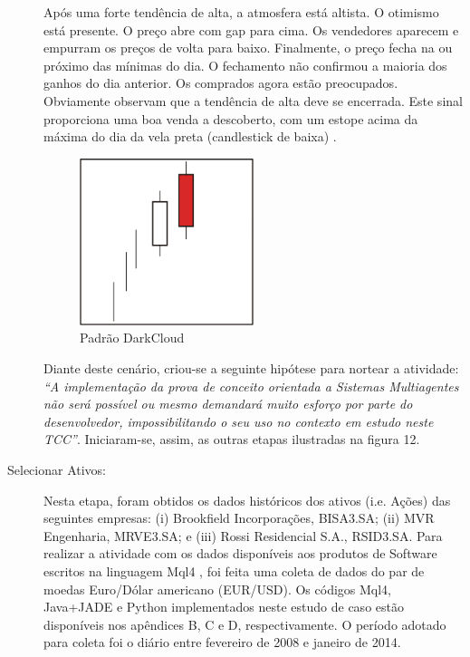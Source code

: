 \begin{description}
\begin{citacao}
Após uma forte tendência de alta, a atmosfera está altista. O otimismo está presente. O preço abre com gap para cima. Os vendedores aparecem e empurram os preços de volta para baixo. Finalmente, o preço fecha na ou próximo das mínimas do dia. O fechamento não confirmou a maioria dos ganhos do dia anterior. Os comprados agora estão preocupados. Obviamente observam que a tendência de alta deve se encerrada. Este sinal proporciona uma boa venda a descoberto, com um estope acima da máxima do dia da vela preta (candlestick de baixa) . \newline \cite[p.47]{bigalow2010}

\end{citacao}
\begin{figure}[h]
\centering
\label{f14}
\includegraphics[width=0.5\textwidth]{figuras/f11}
\caption{Padrão DarkCloud}

\end{figure}

Diante deste cenário, criou-se a seguinte hipótese para nortear a atividade: \textit{“A implementação da prova de conceito orientada a Sistemas Multiagentes não será possível ou mesmo demandará muito esforço por parte do desenvolvedor, impossibilitando o seu uso no contexto em estudo neste TCC”}. Iniciaram-se, assim, as outras etapas ilustradas na figura 12.

\item [Selecionar Ativos:]
Nesta etapa, foram obtidos os dados históricos dos ativos (i.e. Ações) das seguintes empresas: (i) Brookfield Incorporações, BISA3.SA; (ii) MVR Engenharia, MRVE3.SA; e (iii) Rossi Residencial S.A., RSID3.SA. Para realizar a atividade com os dados disponíveis aos produtos de Software escritos na linguagem Mql4 \cite{kovalyov2006}, foi feita uma coleta de dados do par de moedas Euro/Dólar americano (EUR/USD). Os códigos Mql4, Java+JADE e Python implementados neste estudo de caso estão disponíveis nos apêndices B, C e D, respectivamente. O período adotado para coleta foi o diário entre fevereiro de 2008 e janeiro de 2014.


\end{description}
